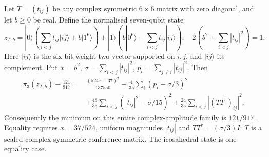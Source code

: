 \begin{theorem}[proved; CC-1]\label{thm:complexsos}
Let $T=(t_{ij})$ be any complex symmetric $6\times6$ matrix with zero
diagonal, and let $b\geq0$ be real. Define the normalised seven-qubit state
\[
 z_{T,b}=|0\rangle\left(\sum_{i<j}t_{ij}|ij\rangle+b|1^6\rangle\right)
  +|1\rangle\left(b|0^6\rangle-
       \sum_{i<j}\overline{t_{ij}}|\overline{ij}\rangle\right),
 \quad 2\left(b^2+\sum_{i<j}|t_{ij}|^2\right)=1.
\]
Here $|ij\rangle$ is the six-bit weight-two vector supported on $i,j$,
and $|\overline{ij}\rangle$ its complement. Put
$x=b^2$, $\sigma=\sum_{i<j}|t_{ij}|^2$, $p_i=\sum_{j\ne i}|t_{ij}|^2$. Then
\begin{equation}\label{eq:complexsos}
\begin{split}
 \pi_3(z_{T,b})-\frac{121}{917}
 ={}&\frac{(524x-37)^2}{137550}
 +\frac4{35}\sum_i(p_i-\sigma/3)^2\\
 &+\frac{48}{35}\sum_{i<j}(|t_{ij}|^2-\sigma/15)^2
 +\frac{24}{35}\sum_{i<j}|(TT^\dagger)_{ij}|^2.
\end{split}
\end{equation}
Consequently the minimum on this entire complex-amplitude family is
$121/917$. Equality requires $x=37/524$, uniform magnitudes $|t_{ij}|$
and $TT^\dagger=(\sigma/3)I$: $T$ is a scaled complex symmetric conference
matrix. The icosahedral state is one equality case.
\end{theorem}
